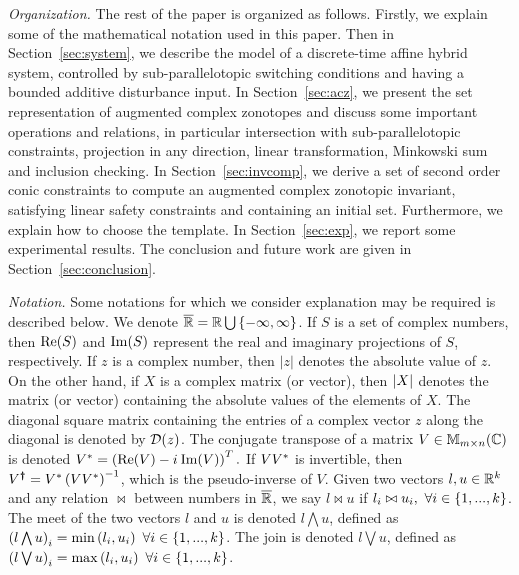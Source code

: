 \emph{Organization.}  The rest of the paper is organized as follows.  Firstly, we explain
some of the mathematical notation used in this paper.  Then in
Section~\ref{sec:system}, we describe the model of a discrete-time
affine hybrid system, controlled by sub-parallelotopic switching
conditions and having a bounded additive disturbance input. In
Section~\ref{sec:acz}, we present the set representation of augmented
complex zonotopes and discuss some important operations and relations,
in particular intersection with sub-parallelotopic constraints,
projection in any direction, linear transformation, Minkowski sum and
inclusion checking.  In Section~\ref{sec:invcomp}, we derive a set of
second order conic constraints to compute an augmented complex
zonotopic invariant, satisfying linear safety constraints and
containing an initial set.  Furthermore, we explain how to choose the
template.  In Section~\ref{sec:exp}, we report some experimental
results.  The conclusion and future work are given in
Section~\ref{sec:conclusion}.

\emph{Notation.} Some notations for which we
consider explanation may be required is described below.  We denote
$\mathbb{\overline{R}} = \mathbb{R}\bigcup\left\{-\infty,\infty\right\}$.  If $S$ is a
set of complex numbers, then $\operatorname{\operatorname{Re}}(S)$ and $\operatorname{\operatorname{Im}}(S)$ represent the
real and imaginary projections of $S$, respectively.  If $z$ is a
complex number, then $|z|$ denotes the absolute value of $z$.  On the
other hand, if $X$ is a complex matrix (or vector), then $\left|X\right|$
denotes the matrix (or vector) containing the absolute values of the
elements of $X$.  The diagonal square matrix containing the entries of
a complex vector $z$ along the diagonal is denoted by $\mathcal{D}(z)$.  The
conjugate transpose of a matrix $V\in\mathbb{M}_{m\times n}(\mathbb{\mathbb{C}})$ is
denoted $V^* = \left(\operatorname{\operatorname{Re}}(V)-{i\mkern1mu}\operatorname{\operatorname{Im}}(V)\right)^T.$ If
$VV^*$ is invertible, then
$V^{\bm{\dagger}}= V^*\left(VV^*\right)^{-1}$, which is
the pseudo-inverse of $V$.  Given two vectors $l,u\in\mathbb{R}^k$ and
any relation $\bowtie$ between numbers in $\mathbb{\overline{R}}$, we say
$l\bowtie u$ if $l_i\bowtie u_i,~\forall i\in\{1,...,k\}$.  The meet of
the two vectors $l$ and $u$ is denoted $l\bigwedge u$, defined as
$\left(l\bigwedge u\right)_i=\min\left(l_i,u_i\right)~\forall i\in\{1,...,k\}$.  The
join is denoted $l\bigvee u$, defined as $\left(l\bigvee
u\right)_i=\max\left(l_i,u_i\right)~\forall i\in\{1,...,k\}$.
